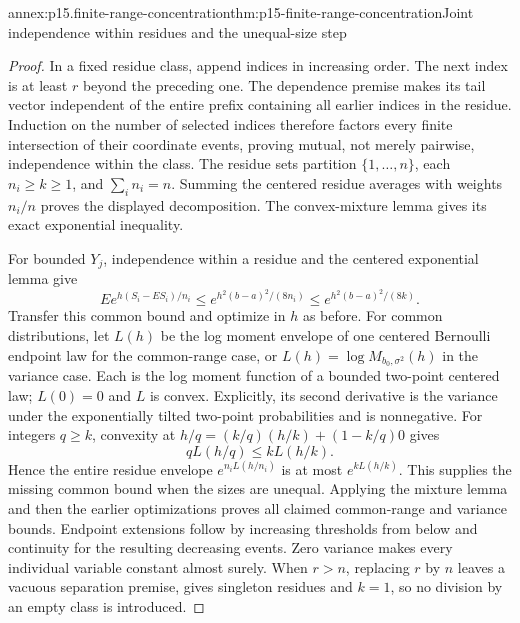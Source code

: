 \begin{annexitem}{annex:p15.finite-range-concentration}{thm:p15-finite-range-concentration}{Joint independence within residues and the unequal-size step}
\begin{proof}
In a fixed residue class, append indices in increasing order.
The next index is at least \(r\) beyond the preceding one.
The dependence premise makes its tail vector independent of the
entire prefix containing all earlier indices in the residue.
Induction on the number of selected indices therefore factors every
finite intersection of their coordinate events, proving mutual,
not merely pairwise, independence within the class.
The residue sets partition \(\{1,\ldots,n\}\), each \(n_i\geq k\geq1\),
and \(\sum_i n_i=n\). Summing the centered residue averages with
weights \(n_i/n\) proves the displayed decomposition.
The convex-mixture lemma gives its exact exponential inequality.

For bounded \(Y_j\), independence within a residue and the centered
exponential lemma give
\[
 E e^{h(S_i-ES_i)/n_i}
 \leq e^{h^2(b-a)^2/(8n_i)}
 \leq e^{h^2(b-a)^2/(8k)}.
\]
Transfer this common bound and optimize in \(h\) as before.
For common distributions, let \(L(h)\) be the log moment envelope
of one centered Bernoulli endpoint law for the common-range case,
or \(L(h)=\log M_{b_0,\sigma^2}(h)\) in the variance case.
Each is the log moment function of a bounded two-point centered law;
\(L(0)=0\) and \(L\) is convex. Explicitly,
its second derivative is the variance under the exponentially tilted
two-point probabilities and is nonnegative.
For integers \(q\geq k\), convexity at
\(h/q=(k/q)(h/k)+(1-k/q)0\) gives
\[
 qL(h/q)\leq kL(h/k).
\]
Hence the entire residue envelope \(e^{n_iL(h/n_i)}\) is at most
\(e^{kL(h/k)}\). This supplies the missing common bound when the
sizes are unequal. Applying the mixture lemma and then the earlier
optimizations proves all claimed common-range and variance bounds.
Endpoint extensions follow by increasing thresholds from below and
continuity for the resulting decreasing events. Zero
variance makes every individual variable constant almost surely.
When \(r>n\), replacing \(r\) by \(n\) leaves a vacuous separation
premise, gives singleton residues and \(k=1\), so no division by an
empty class is introduced.
\end{proof}
\end{annexitem}

